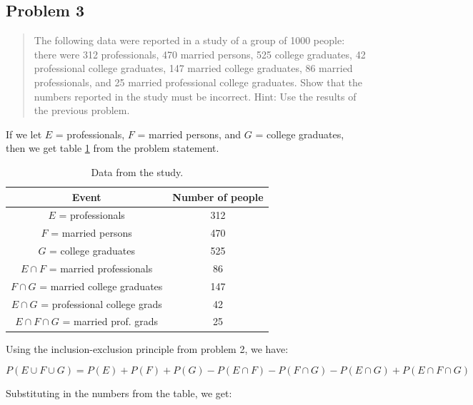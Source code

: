 \documentclass[10pt]{article}
\begin{document}
\subsection*{Problem 3}
\begin{quote}
	The following data were reported in a study of a group of 1000 people: there were 312 professionals, 470 married persons, 525 college graduates, 42 professional college graduates, 147 married college graduates, 86 married professionals, and 25 married professional college graduates. Show that the numbers reported in the study must be incorrect. Hint: Use the results of the previous problem.
\end{quote}

\divider

If we let $E$ = professionals, $F$ = married persons, and $G$ = college graduates, then we get table \ref{tab:data} from the problem statement.

\begin{table}
	\centering
	\begin{tabular}{|c|c|}
		\hline
		Event                                   & Number of people \\
		\hline
		$E$ = professionals                     & 312              \\
		$F$ = married persons                   & 470              \\
		$G$ = college graduates                 & 525              \\
		$E \cap F$ = married professionals      & 86               \\
		$F \cap G$ = married college graduates  & 147              \\
		$E \cap G$ = professional college grads & 42               \\
		$E \cap F \cap G$ = married prof. grads & 25               \\
		\hline
	\end{tabular}
	\caption{Data from the study.}
	\label{tab:data}
\end{table}

Using the inclusion-exclusion principle from problem 2, we have:

\begin{equation}
	P(E \cup F \cup G) = P(E) + P(F) + P(G) - P(E \cap F) - P(F \cap G) - P(E \cap G) + P(E \cap F \cap G)
\end{equation}

Substituting in the numbers from the table, we get:
\end{document}
